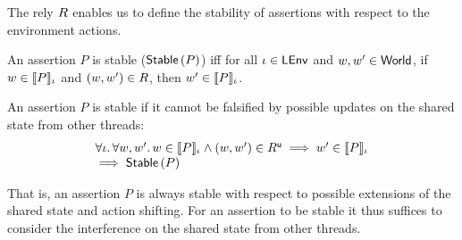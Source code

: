 The rely $\rely$ enables us to define the stability of assertions with respect to the environment actions.
%
\begin{definition}[Stability] An assertion $P$ is stable ($\stable{P}$) iff for all $\lenv \in \LEnv$ and $w, w' \in \Worlds$, if $w \in \sem[\lenv]{P}$ and $(w, w') \in \rely$, then $w' \in \sem[\lenv]{P}$.
\end{definition}
%
\begin{lemma}[Stability]
An assertion $P$ is stable if it cannot be falsified by possible updates on the shared state from other threads:
%
\[
\begin{array}{l}
	\for{\lenv}\for{w, w'} 
     w \in \sem[\lenv]{P} \land (w, w') \in \updateR \implies
	 w' \in \sem[\lenv]{P}\\
	 
	 \implies \stable{P}
\end{array}	 
\]
%
\end{lemma}
%
That is, an assertion $P$ is always stable with respect to possible extensions of the shared state and action shifting. For an assertion to be stable it thus suffices to consider the interference on the shared state from other threads.
%
